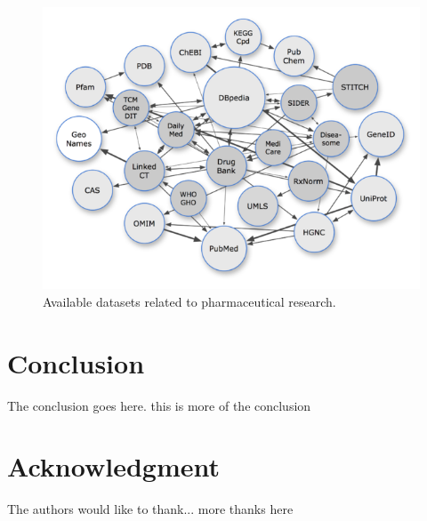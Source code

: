 \documentclass[10pt, conference, compsocconf]{IEEEtran}
\begin{document}
\begin{figure}[tb]
	\centering
		\includegraphics[width=1.0\columnwidth]{images/lod_cloud.png}
	\caption{Available datasets related to pharmaceutical research.}
	\label{fig:lod}
\end{figure}


\section{Conclusion}
The conclusion goes here. this is more of the conclusion



\section*{Acknowledgment}


The authors would like to thank...
more thanks here








\end{document}
